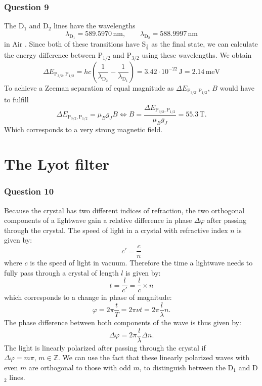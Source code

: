 \subsubsection{Question 9}\label{subsec:Question9}
The D$_1$ and D$_2$ lines have the wavelengths
\begin{equation}
	\lambda_{\mathrm D_1}= 589.5970 \,\si{\nano\metre}, \qquad \lambda_{\mathrm D_2}=588.9997 \,\si{\nano\metre}
\end{equation}
in Air  \cite[Tabs. 3\&4]{sodiumdata}.
Since both of these transitions have S$_\frac{1}{2}$ as the final state, we can calculate the energy difference between P$_{1/2}$ and P$_{3/2}$ using these wavelengths. We obtain
\begin{equation}
	\Delta E_{\mathrm P_{3/2},\mathrm P_{1/2}} =hc\left(	\frac{1}{\lambda_{\mathrm D_2}}-		\frac{1}{\lambda_{\mathrm D_1}}\right)=3.42\cdot 10^{-22} \, \si{\joule}=2.14 \, \si{\milli\electronvolt} \label{eq:energiedifferenz}
\end{equation}
To achieve a Zeeman separation of equal magnitude as $	\Delta E_{\mathrm P_{3/2},\mathrm P_{1/2}}$, $B$ would have to fulfill
\begin{equation}	\Delta E_{\mathrm P_{3/2},\mathrm P_{1/2}}=\mu_Bg_JB\Leftrightarrow B=\frac{	\Delta E_{\mathrm P_{3/2},\mathrm P_{1/2}}}{\mu_Bg_J}=55.3 \, \si{\tesla}.\end{equation}
Which corresponds to a very strong magnetic field.
\section{The Lyot filter}
\subsubsection{Question 10}
Because the crystal has two different indices of refraction, the two orthogonal components of a lightwave gain a relative difference in phase $\Delta \varphi$ after passing through the crystal. The speed of light in a crystal with refractive index $n$ is given by:
\begin{equation}
	c'=\frac{c}{n}
\end{equation}
where $c$ is the speed of light in vacuum. Therefore the time a lightwave needs  to fully pass through a crystal of length $l$ is given by:
\begin{equation}
	t=\frac{l}{c'}=\frac{l}{c}\times n
\end{equation} 
which corresponds to a change  in phase of magnitude:
\begin{equation}
	\varphi=2\pi \frac{t}{T}=2\pi\nu t=2\pi \frac{l}{\lambda}n.
\end{equation}
The phase difference between both components of the wave is thus given by:
\begin{equation}
	\Delta\varphi=2\pi \frac{l}{\lambda}\Delta n.
\end{equation}
The light is linearly polarized after passing through the crystal if $\Delta\varphi= m \pi, \, m\in \mathbb Z$. We  can use the fact that these linearly polarized waves with even $m$ are orthogonal to those with odd $m$, to distinguish between the D$_1$ and D$_2$ lines. \cite[Chap.~4.2.8]{demtröderLASER}

